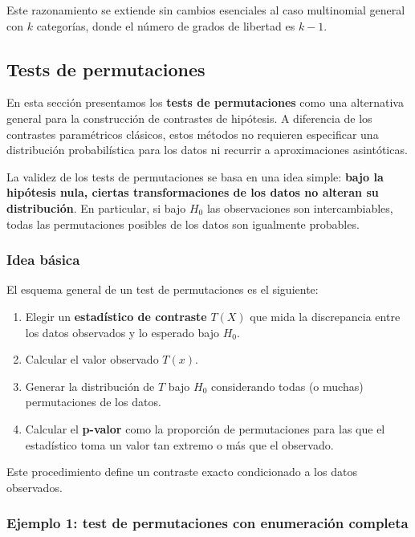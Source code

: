 \documentclass[
]{article}
\providecommand{\tightlist}{%
  \setlength{\itemsep}{0pt}\setlength{\parskip}{0pt}}
\begin{document}
Este razonamiento se extiende sin cambios esenciales al caso multinomial general con \(k\) categorías, donde el número de grados de libertad es \(k-1\).

\subsection{Tests de permutaciones}\label{tests-de-permutaciones}

En esta sección presentamos los \textbf{tests de permutaciones} como una alternativa general para la construcción de contrastes de hipótesis. A diferencia de los contrastes paramétricos clásicos, estos métodos no requieren especificar una distribución probabilística para los datos ni recurrir a aproximaciones asintóticas.

La validez de los tests de permutaciones se basa en una idea simple: \textbf{bajo la hipótesis nula, ciertas transformaciones de los datos no alteran su distribución}. En particular, si bajo \(H_0\) las observaciones son intercambiables, todas las permutaciones posibles de los datos son igualmente probables.

\subsubsection{Idea básica}\label{idea-buxe1sica}

El esquema general de un test de permutaciones es el siguiente:

\begin{enumerate}
\def\labelenumi{\arabic{enumi}.}
\tightlist
\item
  Elegir un \textbf{estadístico de contraste} \(T(X)\) que mida la discrepancia entre los datos observados y lo esperado bajo \(H_0\).
\item
  Calcular el valor observado \(T(x)\).
\item
  Generar la distribución de \(T\) bajo \(H_0\) considerando todas (o muchas) permutaciones de los datos.
\item
  Calcular el \textbf{p-valor} como la proporción de permutaciones para las que el estadístico toma un valor tan extremo o más que el observado.
\end{enumerate}

Este procedimiento define un contraste exacto condicionado a los datos observados.

\subsubsection{Ejemplo 1: test de permutaciones con enumeración completa}\label{ejemplo-1-test-de-permutaciones-con-enumeraciuxf3n-completa}
\end{document}
